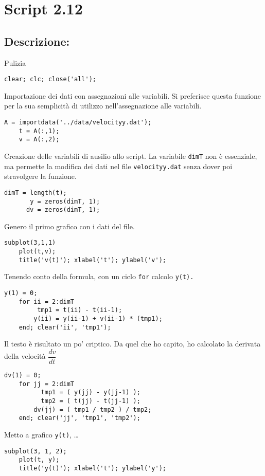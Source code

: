 \section{Script 2.12}\label{scr:script212}

\subsection{Descrizione:}
Pulizia
\begin{lstlisting}[firstnumber=1]   
    clear; clc; close('all');
\end{lstlisting}
\vspace{1em}

Importazione dei dati con assegnazioni alle variabili. Si preferisce questa 
funzione per la sua semplicità di utilizzo nell'assegnazione alle variabili.
\begin{lstlisting}[firstnumber=2]
    A = importdata('../data/velocityy.dat');
    t = A(:,1);
    v = A(:,2);
\end{lstlisting}
\vspace{1em}

Creazione delle variabili di ausilio allo script. La variabile \verb|dimT| non 
è essenziale, ma permette la modifica dei dati nel file \verb|velocityy.dat| 
senza dover poi stravolgere la funzione.
\begin{lstlisting}[firstnumber=5]
    dimT = length(t);
       y = zeros(dimT, 1);
      dv = zeros(dimT, 1);
\end{lstlisting}
\vspace{1em}

Genero il primo grafico con i dati del file.
\begin{lstlisting}[firstnumber=8]
    subplot(3,1,1)
    plot(t,v);
    title('v(t)'); xlabel('t'); ylabel('v');
\end{lstlisting}
\vspace{1em}

Tenendo conto della formula, con un ciclo \texttt{for} calcolo \texttt{y(t).}
\begin{lstlisting}[firstnumber=11]
      y(1) = 0;
    for ii = 2:dimT
         tmp1 = t(ii) - t(ii-1);
        y(ii) = y(ii-1) + v(ii-1) * (tmp1);
    end; clear('ii', 'tmp1');
\end{lstlisting}
\vspace{1em}


Il testo è risultato un po' criptico. Da quel che ho capito, ho calcolato la 
derivata della velocità $\dfrac{dv}{dt}$\vspace{0.5em}
\begin{lstlisting}[firstnumber=16]
     dv(1) = 0;
    for jj = 2:dimT
          tmp1 = ( y(jj) - y(jj-1) );
          tmp2 = ( t(jj) - t(jj-1) );
        dv(jj) = ( tmp1 / tmp2 ) / tmp2;
    end; clear('jj', 'tmp1', 'tmp2');
\end{lstlisting}
\vspace{1em}
\pagebreak
Metto a grafico \texttt{y(t)}, \dots
\begin{lstlisting}[firstnumber=22]
    subplot(3, 1, 2);
    plot(t, y);
    title('y(t)'); xlabel('t'); ylabel('y');
\end{lstlisting}
\vspace{1em}

